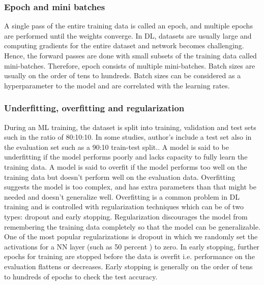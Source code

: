 \documentclass[pdflatex,sn-mathphys]{sn-jnl}%
\theoremstyle{thmstyleone}%
\theoremstyle{thmstyletwo}%
\theoremstyle{thmstylethree}%
\begin{document}
\subsubsection{Epoch and mini batches}
A single pass of the entire training data is called an epoch, and multiple epochs are performed until the weights converge. In DL, datasets are usually large and computing gradients for the entire dataset and network becomes challenging. Hence, the forward passes are done with small subsets of the training data called mini-batches. Therefore,  epoch consists of multiple mini-batches.  Batch sizes are usually on the order of tens to hundreds. Batch sizes can be considered as a hyperparameter to the model and are correlated with the learning rates. 

\subsubsection{Underfitting, overfitting and regularization}
During an ML training, the dataset is split into training, validation and test sets such in the ratio of 80:10:10. In some studies, author's include a test set also in the evaluation set such as a 90:10 train-test split.. A model is said to be underfitting if the model performs poorly and lacks capacity to fully learn the training data. A model is said to overfit if the model performs too well on the training data but doesn't perform well on the evaluation data. Overfitting suggests the model is too complex, and has extra parameters than that might be needed and doesn't generalize well. Overfitting is a common problem in DL training and is controlled with regularization techniques which can be of two types: dropout and early stopping. Regularization discourages the model from remembering the training data completely so that the model can be generalizable. One of the most popular regularizations is dropout in which we randomly set the activations for a NN layer (such as 50 percent )  to zero. In early stopping, further epochs for training are stopped before the data is overfit i.e. performance on the evaluation flattens or decreases. Early stopping is generally on the order of tens to hundreds of epochs to check the test accuracy.
\end{document}
